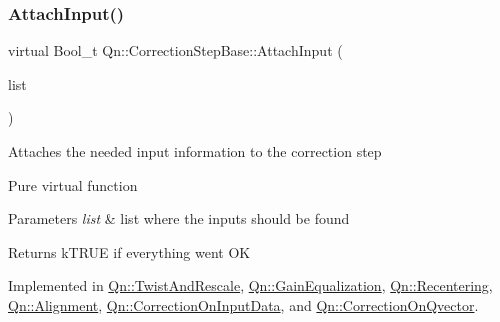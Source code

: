 \mbox{\label{classQn_1_1CorrectionStepBase_aa778d3926bb1ee463753466f2216187d}} 
\subsubsection{\texorpdfstring{Attach\+Input()}{AttachInput()}}
{\footnotesize\ttfamily virtual Bool\+\_\+t Qn\+::\+Correction\+Step\+Base\+::\+Attach\+Input (\begin{DoxyParamCaption}\item[{T\+List $\ast$}]{list }\end{DoxyParamCaption})\hspace{0.3cm}{\ttfamily [pure virtual]}}

Attaches the needed input information to the correction step

Pure virtual function 
\begin{DoxyParams}{Parameters}
{\em list} & list where the inputs should be found \\
\hline
\end{DoxyParams}
\begin{DoxyReturn}{Returns}
k\+T\+R\+UE if everything went OK 
\end{DoxyReturn}


Implemented in \mbox{\hyperlink{classQn_1_1TwistAndRescale_af6ca5526d392329f6f35adcc261de349}{Qn\+::\+Twist\+And\+Rescale}}, \mbox{\hyperlink{classQn_1_1GainEqualization_a167a6348fcdf8c0f48cb16a3dd9d1c29}{Qn\+::\+Gain\+Equalization}}, \mbox{\hyperlink{classQn_1_1Recentering_ae931dc184caefa05392992a15ae5b53f}{Qn\+::\+Recentering}}, \mbox{\hyperlink{classQn_1_1Alignment_a3ae85e6706fe2a04098d339fcfff9113}{Qn\+::\+Alignment}}, \mbox{\hyperlink{classQn_1_1CorrectionOnInputData_a37c53966c0121ed0f7d764a9769690be}{Qn\+::\+Correction\+On\+Input\+Data}}, and \mbox{\hyperlink{classQn_1_1CorrectionOnQvector_acb7165c2eb071517fa977484bee7e445}{Qn\+::\+Correction\+On\+Qvector}}.

\mbox{\label{classQn_1_1CorrectionStepBase_aad04f26aeb59df7735255afa10ac931e}} 
